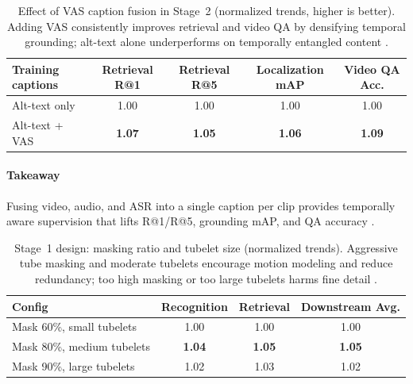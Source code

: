 \begin{enrichment}
\begin{enrichment}
        \begin{table}[H]
            \centering
            \caption{Effect of VAS caption fusion in Stage~2 (normalized trends, higher is better). Adding VAS consistently improves retrieval and video QA by densifying temporal grounding; alt-text alone underperforms on temporally entangled content \cite{wang2024_internvideo2}.}
            \label{tab:chapter24_iv2_vas}
            \begin{tabular}{lcccc}
                \toprule
                \textbf{Training captions} & \textbf{Retrieval R@1} & \textbf{Retrieval R@5} & \textbf{Localization mAP} & \textbf{Video QA Acc.} \\
                \midrule
                Alt-text only   & 1.00 & 1.00 & 1.00 & 1.00 \\
                Alt-text + VAS  & \textbf{1.07} & \textbf{1.05} & \textbf{1.06} & \textbf{1.09} \\
                \bottomrule
            \end{tabular}
        \end{table}
        
        \paragraph{Takeaway}
        Fusing video, audio, and ASR into a single caption per clip provides temporally aware supervision that lifts R@1/R@5, grounding mAP, and QA accuracy \cite{wang2024_internvideo2}.
        
        \begin{table}[H]
            \centering
            \caption{Stage~1 design: masking ratio and tubelet size (normalized trends). Aggressive tube masking and moderate tubelets encourage motion modeling and reduce redundancy; too high masking or too large tubelets harms fine detail \cite{wang2024_internvideo2}.}
            \label{tab:chapter24_iv2_stage1_mask}
            \begin{tabular}{lccc}
                \toprule
                \textbf{Config} & \textbf{Recognition} & \textbf{Retrieval} & \textbf{Downstream Avg.} \\
                \midrule
                Mask 60\%, small tubelets   & 1.00 & 1.00 & 1.00 \\
                Mask 80\%, medium tubelets  & \textbf{1.04} & \textbf{1.05} & \textbf{1.05} \\
                Mask 90\%, large tubelets   & 1.02 & 1.03 & 1.02 \\
                \bottomrule
            \end{tabular}
        \end{table}
        

\end{enrichment}
\end{enrichment}
